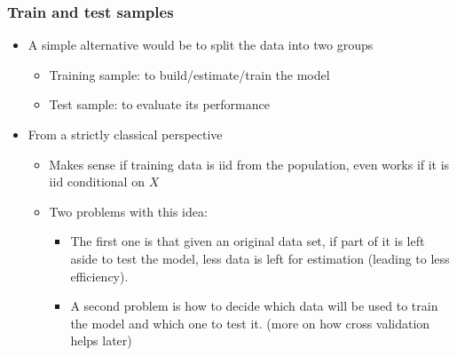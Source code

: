\documentclass[
  shownotes,
  xcolor={svgnames},
  hyperref={colorlinks,citecolor=DarkBlue,linkcolor=DarkRed,urlcolor=DarkBlue}
  ]{beamer}
\begin{document}
\begin{frame}
\frametitle{Train and test samples}

\begin{itemize}
  \item A simple alternative would be to split the data into two groups
  \begin{itemize}
    \item  Training sample: to build/estimate/train the model
    \medskip
    \item  Test sample:  to evaluate its performance 
  \end{itemize}

\bigskip
\item From a strictly classical perspective 
\begin{itemize}
  \item Makes sense if training data is iid from the population, even works if it is iid conditional on $X$
  \medskip
  \item Two problems with this idea:
  \begin{itemize}
    \item  The first one is that given an original data set, if part of it is left aside to test the model, less data is left for estimation (leading to less efficiency). 
    \item A second problem is how to decide which data will be used to train the model and which one to test it. {\tiny (more on how cross validation helps later)}
  \end{itemize}
\end{itemize}


 \end{itemize}


\end{frame}
\end{document}
